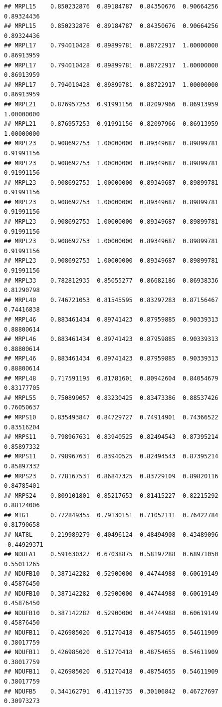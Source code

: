 \documentclass[
]{article}
\begin{document}
\begin{verbatim}
## MRPL15    0.850232876  0.89184787  0.84350676  0.90664256  0.89324436
## MRPL15    0.850232876  0.89184787  0.84350676  0.90664256  0.89324436
## MRPL17    0.794010428  0.89899781  0.88722917  1.00000000  0.86913959
## MRPL17    0.794010428  0.89899781  0.88722917  1.00000000  0.86913959
## MRPL17    0.794010428  0.89899781  0.88722917  1.00000000  0.86913959
## MRPL21    0.876957253  0.91991156  0.82097966  0.86913959  1.00000000
## MRPL21    0.876957253  0.91991156  0.82097966  0.86913959  1.00000000
## MRPL23    0.908692753  1.00000000  0.89349687  0.89899781  0.91991156
## MRPL23    0.908692753  1.00000000  0.89349687  0.89899781  0.91991156
## MRPL23    0.908692753  1.00000000  0.89349687  0.89899781  0.91991156
## MRPL23    0.908692753  1.00000000  0.89349687  0.89899781  0.91991156
## MRPL23    0.908692753  1.00000000  0.89349687  0.89899781  0.91991156
## MRPL23    0.908692753  1.00000000  0.89349687  0.89899781  0.91991156
## MRPL23    0.908692753  1.00000000  0.89349687  0.89899781  0.91991156
## MRPL33    0.782812935  0.85055277  0.86682186  0.86938336  0.81290798
## MRPL40    0.746721053  0.81545595  0.83297283  0.87156467  0.74416838
## MRPL46    0.883461434  0.89741423  0.87959885  0.90339313  0.88800614
## MRPL46    0.883461434  0.89741423  0.87959885  0.90339313  0.88800614
## MRPL46    0.883461434  0.89741423  0.87959885  0.90339313  0.88800614
## MRPL48    0.717591195  0.81781601  0.80942604  0.84054679  0.83177705
## MRPL55    0.750899057  0.83230425  0.83473386  0.88537426  0.76050637
## MRPS10    0.835493847  0.84729727  0.74914901  0.74366522  0.83516204
## MRPS11    0.798967631  0.83940525  0.82494543  0.87395214  0.85897332
## MRPS11    0.798967631  0.83940525  0.82494543  0.87395214  0.85897332
## MRPS23    0.778167531  0.86847325  0.83729109  0.89820116  0.84785401
## MRPS24    0.809101801  0.85217653  0.81415227  0.82215292  0.88124006
## MTG1      0.772849355  0.79130151  0.71052111  0.76422784  0.81790658
## NAT8L    -0.219989279 -0.40496124 -0.48494908 -0.43489096 -0.44929371
## NDUFA1    0.591630327  0.67038875  0.58197288  0.68971050  0.55011265
## NDUFB10   0.387142282  0.52900000  0.44744988  0.60619149  0.45876450
## NDUFB10   0.387142282  0.52900000  0.44744988  0.60619149  0.45876450
## NDUFB10   0.387142282  0.52900000  0.44744988  0.60619149  0.45876450
## NDUFB11   0.426985020  0.51270418  0.48754655  0.54611909  0.38017759
## NDUFB11   0.426985020  0.51270418  0.48754655  0.54611909  0.38017759
## NDUFB11   0.426985020  0.51270418  0.48754655  0.54611909  0.38017759
## NDUFB5    0.344162791  0.41119735  0.30106842  0.46727697  0.30973273

\end{verbatim}
\end{document}
